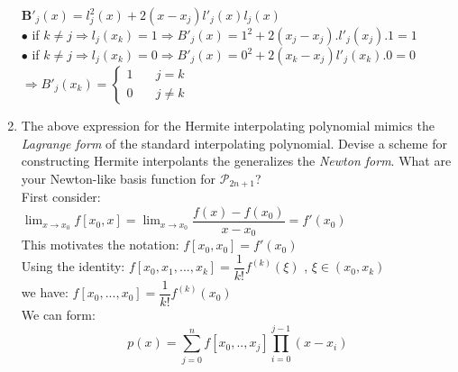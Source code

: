 \documentclass[14pt,a4paper]{article}
\begin{document}
\begin{enumerate}
		$\textbf{B}'_j(x) = l_j^2(x) + 2(x-x_j)l'_j(x)l_j(x)$ \\
		\hspace*{1cm} $\bullet$ if $k \neq j \Rightarrow l_j(x_k) = 1 \Rightarrow B'_j(x) = 1^2 + 2(x_j-x_j).l'_j(x_j).1 = 1$ \\
		\hspace*{1cm} $\bullet$ if $k \neq j \Rightarrow l_j(x_k) = 0 \Rightarrow B'_j(x) = 0^2 + 2(x_k-x_j)l'_j(x_k).0=0 $ \\
		\hspace*{1.5cm} $ \Rightarrow B'_j(x_k) = \begin{cases} 1 & \quad j = k  \\ 0 & \quad j \neq k 	\end{cases} $ \\
		
		\item The above expression for the Hermite interpolating polynomial mimics the \textit{Lagrange form} of the standard interpolating polynomial. Devise a scheme for constructing Hermite interpolants the generalizes the \textit{Newton form}. What are your Newton-like basis function for $\mathcal{P}_{2n+1}$? \\
		
		First consider: \\
		$\lim_{x \to x_0} f[x_0,x] = \lim_{x \to x_0} \dfrac{f(x) - f(x_0)}{x-x_0} = f'(x_0)$\\
		This motivates the notation: $f[x_0,x_0] = f'(x_0)$\\
		Using the identity: $ f[x_0,x_1,...,x_k] = \dfrac{1}{k!}f^{(k)}(\xi)$ , $\xi \in (x_0,x_k)$ \\
		we have: $f[x_0,...,x_0] = \dfrac{1}{k!}f^{(k)}(x_0)$ \\
		We can form:
		\hspace*{2cm} $$p(x) = \sum_{j=0}^{n}f[x_0,..,x_j]\prod_{i=0}^{j-1}(x-x_i)$$
	\end{enumerate}
	 
\end{document}
